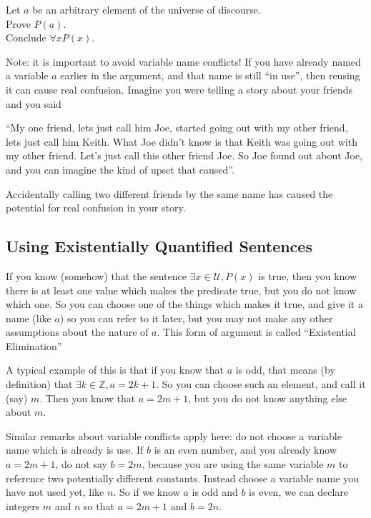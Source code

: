 \begin{fitch*}
	\textrm{Let $a$ be an arbitrary element of the universe of discourse.}\\
	\textrm{Prove $P(a)$}.\\
	\textrm{Conclude $\forall x P(x)$.}
\end{fitch*}

Note:  it is important to avoid variable name conflicts!  If you have already named a variable $a$ earlier in the argument, and that name is still ``in use'', then reusing it can cause real confusion.  Imagine you were telling a story about your friends and you said

``My one friend, lets just call him Joe, started going out with my other friend, lets just call him Keith.  What Joe didn't know is that Keith was going out with my other friend.  Let's just call this other friend Joe.  So Joe found out about Joe, and you can imagine the kind of upset that caused''.

Accidentally calling two different friends by the same name has caused the potential for real confusion in your story.

\subsection{Using Existentially Quantified Sentences}

If you know (somehow) that the sentence $\exists x \in \mathcal{U}, P(x)$ is true, then you know there is at least one value which makes the predicate true, but you do not know which one.  So you can choose one of the things which makes it true, and give it a name (like $a$) so you can refer to it later, but you may not make any other assumptions about the nature of $a$.  This form of argument is called ``Existential Elimination''

A typical example of this is that if you know that $a$ is odd, that means (by definition) that $\exists k \in \mathbb{Z}, a=2k+1$.  So you can choose such an element, and call it (say) $m$.  Then you know that $a=2m+1$, but you do not know anything else about $m$.  

Similar remarks about variable conflicts apply here:  do not choose a variable name which is already is use.  If $b$ is an even number, and you already know $a=2m+1$, do not say $b = 2m$, because you are using the same variable $m$ to reference two potentially different constants.  Instead choose a variable name you have not used yet, like $n$.  So if we know $a$ is odd and $b$ is even, we can declare integers $m$ and $n$ so that $a=2m+1$ and $b = 2n$.

